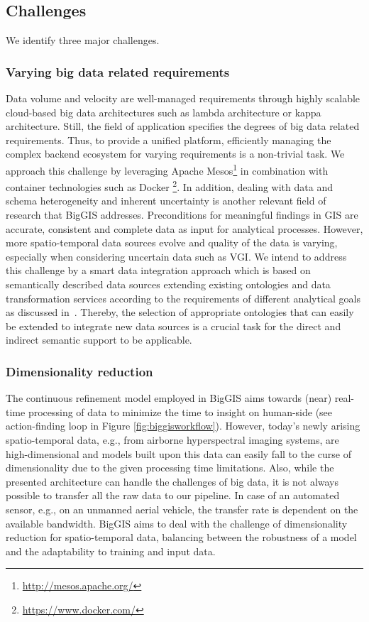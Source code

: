 \documentclass{sig-alternate-05-2015}
\begin{document}
\subsection{Challenges}
\label{sec:chls}
We identify three major challenges.

\subsubsection{Varying big data related requirements}
Data volume and velocity are well-managed requirements through highly
scalable cloud-based big data architectures such as lambda architecture or
kappa architecture. Still, the field of application specifies the degrees of
big data related requirements. Thus, to provide a unified platform, efficiently
managing the complex backend ecosystem for varying requirements is a
non-trivial task. We approach this challenge by leveraging Apache
Mesos\footnote{\url{http://mesos.apache.org/}} in combination with
container technologies such as Docker \footnote{\url{https://www.docker.com/}}.
In addition, dealing with data and schema heterogeneity and
inherent uncertainty is another relevant field of research that BigGIS
addresses. Preconditions for meaningful findings in GIS are accurate,
consistent and complete data as input for analytical processes. However,
more spatio-temporal data sources evolve and quality of the data is
varying, especially when considering uncertain data such as VGI. We intend to
address this challenge by a smart data integration approach which is based on
semantically described data sources extending existing ontologies and data
transformation services according to the requirements of different analytical
goals as discussed in~\cite{Frank.2016a, Frank.2016b}. Thereby, the selection
of appropriate ontologies that can easily be extended to integrate new data
sources is a crucial task for the direct and indirect semantic support to be
applicable.

\subsubsection{Dimensionality reduction}
The continuous refinement model employed in BigGIS aims towards (near)
real-time processing of data to minimize the time to insight on human-side (see
action-finding loop in Figure \ref{fig:biggisworkflow}). However, today's newly
arising spatio-temporal data, e.g., from airborne hyperspectral imaging
systems, are high-dimensional and models built upon this data can easily fall
to the curse of dimensionality due to the given processing time limitations.
Also, while the presented architecture can handle the challenges of big data,
it is not always possible to transfer all the raw data to our pipeline. In case
of an automated sensor, e.g., on an unmanned aerial vehicle, the transfer rate
is dependent on the available bandwidth. BigGIS aims to deal with the challenge
of dimensionality reduction for spatio-temporal data, balancing between the
robustness of a model and the adaptability to training and input data. 
\end{document}
